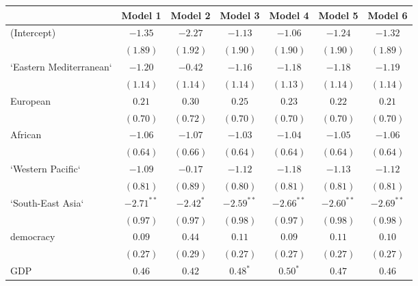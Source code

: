 
\begin{table}[!h]
\begin{center}
\begin{tabular}{l c c c c c c }
\toprule
 & Model 1 & Model 2 & Model 3 & Model 4 & Model 5 & Model 6 \\
\midrule
(Intercept)             & $-1.35$      & $-2.27$      & $-1.13$      & $-1.06$      & $-1.24$      & $-1.32$      \\
                        & $(1.89)$     & $(1.92)$     & $(1.90)$     & $(1.90)$     & $(1.90)$     & $(1.89)$     \\
`Eastern Mediterranean` & $-1.20$      & $-0.42$      & $-1.16$      & $-1.18$      & $-1.18$      & $-1.19$      \\
                        & $(1.14)$     & $(1.14)$     & $(1.14)$     & $(1.13)$     & $(1.14)$     & $(1.14)$     \\
European                & $0.21$       & $0.30$       & $0.25$       & $0.23$       & $0.22$       & $0.21$       \\
                        & $(0.70)$     & $(0.72)$     & $(0.70)$     & $(0.70)$     & $(0.70)$     & $(0.70)$     \\
African                 & $-1.06$      & $-1.07$      & $-1.03$      & $-1.04$      & $-1.05$      & $-1.06$      \\
                        & $(0.64)$     & $(0.66)$     & $(0.64)$     & $(0.64)$     & $(0.64)$     & $(0.64)$     \\
`Western Pacific`       & $-1.09$      & $-0.17$      & $-1.12$      & $-1.18$      & $-1.13$      & $-1.12$      \\
                        & $(0.81)$     & $(0.89)$     & $(0.80)$     & $(0.81)$     & $(0.81)$     & $(0.81)$     \\
`South-East Asia`       & $-2.71^{**}$ & $-2.42^{*}$  & $-2.59^{**}$ & $-2.66^{**}$ & $-2.60^{**}$ & $-2.69^{**}$ \\
                        & $(0.97)$     & $(0.97)$     & $(0.98)$     & $(0.97)$     & $(0.98)$     & $(0.98)$     \\
democracy               & $0.09$       & $0.44$       & $0.11$       & $0.09$       & $0.11$       & $0.10$       \\
                        & $(0.27)$     & $(0.29)$     & $(0.27)$     & $(0.27)$     & $(0.27)$     & $(0.27)$     \\
GDP                     & $0.46$       & $0.42$       & $0.48^{*}$   & $0.50^{*}$   & $0.47$       & $0.46$       \\

\end{tabular}
\end{center}
\end{table}
